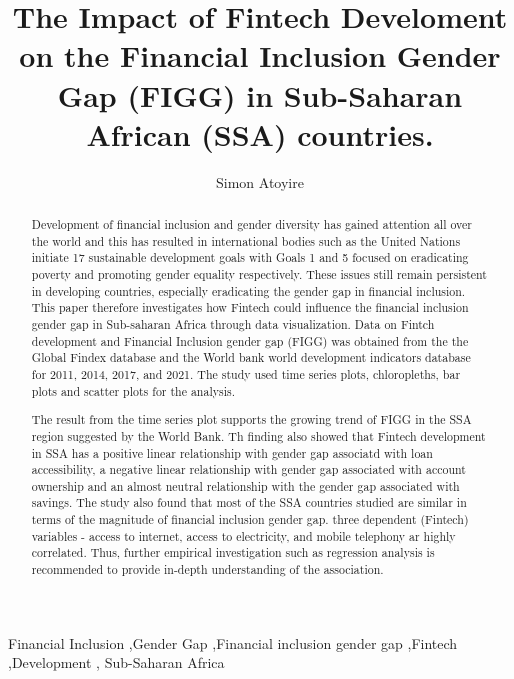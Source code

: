\documentclass[preprint, 3p,
authoryear]{elsarticle} %
\begin{document}
\begin{frontmatter}

  \title{The Impact of Fintech Develoment on the Financial Inclusion
Gender Gap (FIGG) in Sub-Saharan African (SSA) countries.}
    \author[Department of Statistics, Miami University]{Simon Atoyire%
  }
  
  \begin{abstract}
  Development of financial inclusion and gender diversity has gained
  attention all over the world and this has resulted in international
  bodies such as the United Nations initiate 17 sustainable development
  goals with Goals 1 and 5 focused on eradicating poverty and promoting
  gender equality respectively. These issues still remain persistent in
  developing countries, especially eradicating the gender gap in
  financial inclusion. This paper therefore investigates how Fintech
  could influence the financial inclusion gender gap in Sub-saharan
  Africa through data visualization. Data on Fintch development and
  Financial Inclusion gender gap (FIGG) was obtained from the the Global
  Findex database and the World bank world development indicators
  database for 2011, 2014, 2017, and 2021. The study used time series
  plots, chloropleths, bar plots and scatter plots for the analysis.

  The result from the time series plot supports the growing trend of
  FIGG in the SSA region suggested by the World Bank. Th finding also
  showed that Fintech development in SSA has a positive linear
  relationship with gender gap associatd with loan accessibility, a
  negative linear relationship with gender gap associated with account
  ownership and an almost neutral relationship with the gender gap
  associated with savings. The study also found that most of the SSA
  countries studied are similar in terms of the magnitude of financial
  inclusion gender gap. three dependent (Fintech) variables - access to
  internet, access to electricity, and mobile telephony ar highly
  correlated. Thus, further empirical investigation such as regression
  analysis is recommended to provide in-depth understanding of the
  association.
  \end{abstract}
    \begin{keyword}
    Financial Inclusion \sep Gender Gap \sep Financial inclusion gender
gap \sep Fintech \sep Development \sep 
    Sub-Saharan Africa
  \end{keyword}
  
 \end{frontmatter}
\end{document}
